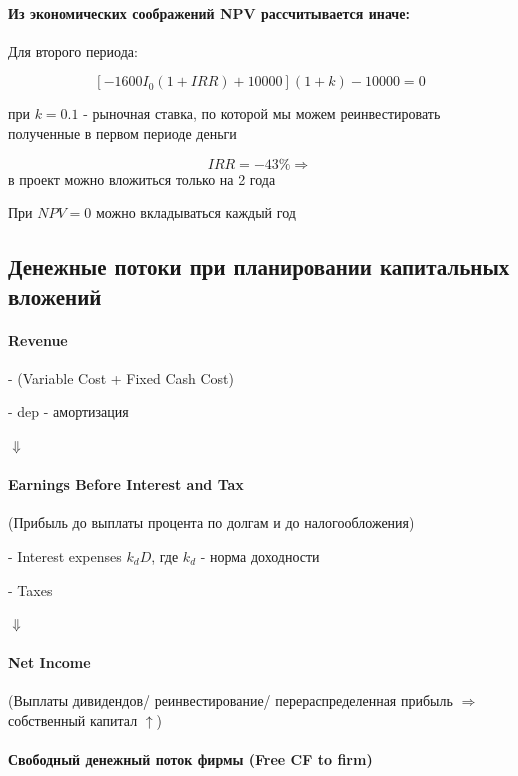 \documentclass[a4paper,12pt]{article} %
\begin{document}
   \paragraph{ Из экономических соображений NPV рассчитывается иначе:     }
   
   Для второго периода: 
   
   \[ [-1600I_0(1+IRR) + 10000](1 + k) - 10000  = 0  \]

при $ k = 0.1 $ - рыночная ставка, по которой мы можем реинвестировать полученные в первом периоде деньги

\[ IRR = - 43 \%  \Rightarrow\]  в проект можно вложиться только на 2 года

При $ NPV  = 0 $ можно вкладываться каждый год




\subsection{Денежные потоки при планировании капитальных вложений}

\paragraph{ Revenue}
 
 - (Variable Cost + Fixed Cash Cost) 
 
 - dep - амортизация
 
$  \Downarrow $
 
\paragraph{ Earnings Before Interest and Tax } (Прибыль до выплаты процента по долгам и до налогообложения) 
 
 -  Interest expenses $ k_d D $,  где $ k_d   $ - норма доходности
 
 - Taxes 
 
 $  \Downarrow $
 
 \paragraph{Net Income }
 (Выплаты дивидендов/ реинвестирование/ перераспределенная прибыль       $ \Rightarrow $ собственный капитал $ \uparrow $)

\paragraph{
Свободный денежный поток фирмы (Free CF to firm) 
}
\end{document}
